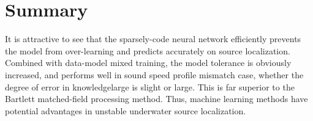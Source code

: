 \section{Summary}
It is attractive to see that the sparsely-code neural network efficiently prevents the model from over-learning and predicts accurately on source localization.
Combined with data-model mixed training, the model tolerance is obviously increased, and performs well in sound speed profile mismatch case, whether  
the degree of error in knowledgelarge is slight or large. 
This is far superior to the Bartlett matched-field processing method.
Thus, machine learning methods have potential advantages in unstable underwater
source localization.

